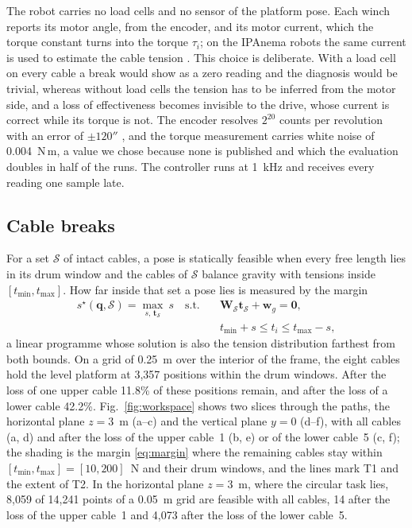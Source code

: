 \documentclass{interact}
\newcommand{\vc}[1]{\bm{#1}}
\newcommand{\mt}[1]{\mathbf{#1}}
\begin{document}
The robot carries no load cells and no sensor of the platform pose. Each winch reports its motor angle, from the encoder, and its motor current, which the torque constant turns into the torque $\tau_i$; on the IPAnema robots the same current is used to estimate the cable tension \citep{pott2013ipanema}. This choice is deliberate. With a load cell on every cable a break would show as a zero reading and the diagnosis would be trivial, whereas without load cells the tension has to be inferred from the motor side, and a loss of effectiveness becomes invisible to the drive, whose current is correct while its torque is not. The encoder resolves $2^{20}$ counts per revolution with an error of $\pm120''$ \citep{rexroth_msk2018}, and the torque measurement carries white noise of 0.004~N\,m, a value we chose because none is published and which the evaluation doubles in half of the runs. The controller runs at 1~kHz and receives every reading one sample late.

\subsection{Cable breaks}\label{sec:workspace}

For a set $\mathcal S$ of intact cables, a pose is statically feasible when every free length lies in its drum window and the cables of $\mathcal S$ balance gravity with tensions inside $[t_{\min},t_{\max}]$. How far inside that set a pose lies is measured by the margin
\begin{equation}\label{eq:margin}
\begin{aligned}
s^\star(\vc q,\mathcal S)=\max_{s,\,\vc t_{\mathcal S}}\ s\quad\text{s.t.}\quad&\mt W_{\mathcal S}\vc t_{\mathcal S}+\vc w_g=\vc 0,\\
&t_{\min}+s\le t_i\le t_{\max}-s,
\end{aligned}
\end{equation}
a linear programme whose solution is also the tension distribution farthest from both bounds. On a grid of 0.25~m over the interior of the frame, the eight cables hold the level platform at 3,357 positions within the drum windows. After the loss of one upper cable 11.8\% of these positions remain, and after the loss of a lower cable 42.2\%. Fig.~\ref{fig:workspace} shows two slices through the paths, the horizontal plane $z=3$~m (a--c) and the vertical plane $y=0$ (d--f), with all cables (a, d) and after the loss of the upper cable~1 (b, e) or of the lower cable~5 (c, f); the shading is the margin \eqref{eq:margin} where the remaining cables stay within $[t_{\min},t_{\max}]=[10,200]$~N and their drum windows, and the lines mark T1 and the extent of T2. In the horizontal plane $z=3$~m, where the circular task lies, 8,059 of 14,241 points of a 0.05~m grid are feasible with all cables, 14 after the loss of the upper cable~1 and 4,073 after the loss of the lower cable~5.
\end{document}
